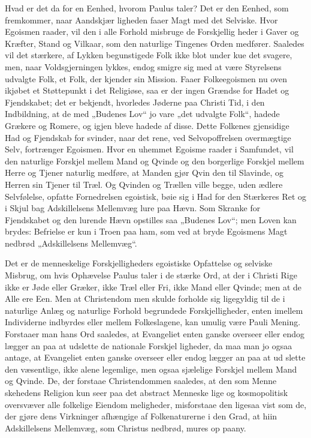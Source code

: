 \documentclass[12pt]{book}
\newcommand{\opage}[1]{\marginnote{\footnotesize\textit{[#1]}}}
\begin{document}
Hvad er det da for en Eenhed, hvorom Paulus taler?
Det er den Eenhed, som fremkommer, naar Aandskjær\-%
ligheden faaer Magt med det Selviske. Hvor Egoismen
raader, vil den i alle Forhold misbruge de Forskjellig\-%
heder i Gaver og Kræfter, Stand og Vilkaar, som den
naturlige Tingenes Orden medfører. Saaledes vil det
stærkere, af Lykken begunstigede Folk ikke blot under\-%
kue det svagere, men, naar Voldsgjerningen lykkes, endog
smigre sig med at være Styrelsens udvalgte Folk, et Folk,
der kjender sin Mission. Faaer Folkeegoismen nu oven\-%
ikjøbet et Støttepunkt i det Religiøse, saa er der ingen
Grændse for Hadet og Fjendskabet; det er bekjendt,
hvorledes Jøderne paa Christi Tid, i den Indbildning, at
de med „Budenes Lov“ jo vare „det udvalgte Folk“,
hadede Grækere og Romere, og igjen bleve hadede af
disse. Dette Folkenes gjensidige Had og Fjendskab for\-%
svinder, naar det rene, ved Selvopoffrelsen overmægtige
Selv, fortrænger Egoismen. Hvor en uhemmet Egoisme
raader i Samfundet, vil den naturlige Forskjel mellem
Mand og Qvinde og den borgerlige Forskjel mellem
Herre og Tjener naturlig medføre, at Manden gjør Qvin\-%
den til Slavinde, og Herren sin Tjener til Træl. Og
Qvinden og Trællen ville begge, uden ædlere Selvfølelse,
opfatte Fornedrelsen egoistisk, bøie sig i Had for den
Stærkeres Ret og i Skjul bag Adskillelsens Mellemvæg
lure paa Hævn. Som Skranke for Fjendskabet og den
lurende Hævn opstilles saa „Budenes Lov“; men Loven
kan brydes: Befrielse er kun i Troen paa ham, som
\opage{137}\setcounter{footnote}{0}%
ved at bryde Egoismens Magt nedbrød „Adskillelsens
Mellemvæg“.

Det er de menneskelige Forskjelligheders egoistiske
Opfattelse og selviske Misbrug, om hvis Ophævelse Paulus
taler i de stærke Ord, at der i Christi Rige ikke er Jøde
eller Græker, ikke Træl eller Fri, ikke Mand eller
Qvinde; men at de Alle ere Een. Men at Christendom\-%
men skulde forholde sig ligegyldig til de i naturlige Anlæg
og naturlige Forhold begrundede Forskjelligheder, enten
imellem Individerne indbyrdes eller mellem Folkeslagene,
kan umulig være Pauli Mening. Forstaaer man hans
Ord saaledes, at Evangeliet enten ganske overseer eller
endog lægger an paa at udslette de nationale Forskjel\-%
ligheder, da maa man jo ogsaa antage, at Evangeliet
enten ganske overseer eller endog lægger an paa at ud\-%
slette den væsentlige, ikke alene legemlige, men ogsaa
sjælelige Forskjel mellem Mand og Qvinde. De, der
forstaae Christendommen saaledes, at den som Menne\-%
skehedens Religion kun seer paa det abstract Menneske\-%
lige og kosmopolitisk oversvæver alle folkelige Eiendom\-%
meligheder, misforstaae den ligesaa vist som de, der
gjøre dens Virkninger afhængige af Folkenaturerne i den
Grad, at hiin Adskillelsens Mellemvæg, som Christus
nedbrød, mures op paany.
\end{document}
